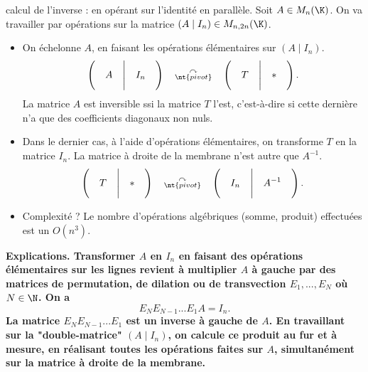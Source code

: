 \documentclass[11pt]{article}
\begin{document}
\begin{meth}{calcul de l'inverse : en opérant sur l'identité en parallèle.}{}
    Soit $A\in M_n(\K)$. On va travailler par opérations sur la matrice $(A\mid I_n)\in M_{n,2n}(\K)$.
    \begin{itemize}
        \item On échelonne $A$, en faisant les opérations élémentaires sur $(A \mid I_n)$.
        \begin{equation*}
            \left(\quad A \quad \Biggr| \quad I_n \quad\right) \quad \substack{\curvearrowright\\\nt{pivot}} \quad \left( \quad T \quad \Biggr| \quad * \quad \right).
        \end{equation*}
        La matrice $A$ est inversible ssi la matrice $T$ l'est, c'est-à-dire si cette dernière n'a que des coefficients diagonaux non nuls.
        \item Dans le dernier cas, à l'aide d'opérations élémentaires, on transforme $T$ en la matrice $I_n$. La matrice à droite de la membrane n'est autre que $A^{-1}$.
        \begin{equation*}
            \left(\quad T \quad \Biggr| \quad * \quad \right) \quad \substack{\curvearrowright\\\nt{pivot}} \quad \left( \quad I_n \quad \Biggr| \quad A^{-1} \quad \right).
        \end{equation*}
        \item Complexité ? Le nombre d'opérations algébriques (somme, produit) effectuées est un $O(n^3)$.
    \end{itemize}
\end{meth}
\bf{Explications.} Transformer $A$ en $I_n$ en faisant des opérations élémentaires sur les lignes revient à multiplier $A$ à gauche par des matrices de permutation, de dilation ou de transvection $E_1,...,E_N$ où $N\in\N$. On a
\begin{equation*}
    E_NE_{N-1}...E_1A=I_n.
\end{equation*}
La matrice $E_NE_{N-1}...E_1$ est un inverse à gauche de $A$. En travaillant sur la "double-matrice" $(A\mid I_n)$, on calcule ce produit au fur et à mesure, en réalisant toutes les opérations faites sur $A$, simultanément sur la matrice à droite de la membrane.
\end{document}
